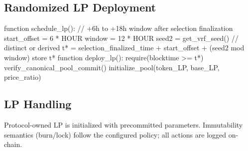 \documentclass[10pt,twocolumn]{article}
\begin{document}
\subsection*{Randomized LP Deployment}
\begin{code}
function schedule_lp():
  // +6h to +18h window after selection finalization
  start_offset = 6 * HOUR
  window = 12 * HOUR
  seed2 = get_vrf_seed()   // distinct or derived
  t* = selection_finalized_time + start_offset + (seed2 mod window)
  store t*
function deploy_lp():
  require(blocktime >= t*)
  verify_canonical_pool_commit()
  initialize_pool(token_LP, base_LP, price_ratio)
\end{code}

\subsection*{LP Handling}
Protocol-owned LP is initialized with precommitted parameters. Immutability semantics (burn/lock) follow the configured policy; all actions are logged on-chain.
\end{document}

